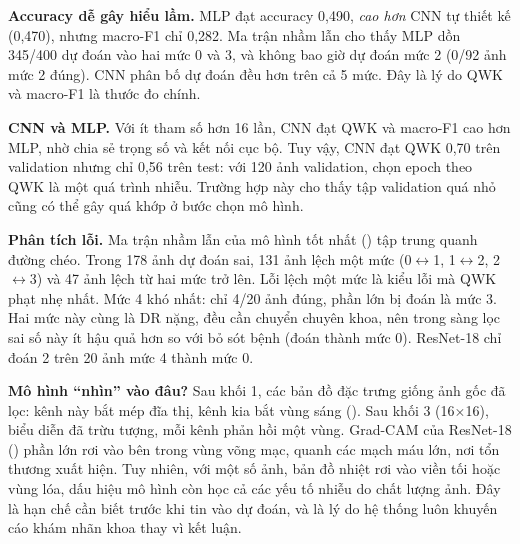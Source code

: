 \textbf{Accuracy dễ gây hiểu lầm.} MLP đạt accuracy 0,490, \emph{cao hơn} CNN tự thiết kế (0,470), nhưng macro-F1 chỉ 0,282. Ma trận nhầm lẫn cho thấy MLP dồn 345/400 dự đoán vào hai mức 0 và 3, và không bao giờ dự đoán mức 2 (0/92 ảnh mức 2 đúng). CNN phân bố dự đoán đều hơn trên cả 5 mức. Đây là lý do QWK và macro-F1 là thước đo chính.

\textbf{CNN và MLP.} Với ít tham số hơn 16 lần, CNN đạt QWK và macro-F1 cao hơn MLP, nhờ chia sẻ trọng số và kết nối cục bộ. Tuy vậy, CNN đạt QWK 0,70 trên validation nhưng chỉ 0,56 trên test: với 120 ảnh validation, chọn epoch theo QWK là một quá trình nhiễu. Trường hợp này cho thấy tập validation quá nhỏ cũng có thể gây quá khớp ở bước chọn mô hình.


\textbf{Phân tích lỗi.} Ma trận nhầm lẫn của mô hình tốt nhất () tập trung quanh đường chéo. Trong 178 ảnh dự đoán sai, 131 ảnh lệch một mức (0$\leftrightarrow$1, 1$\leftrightarrow$2, 2$\leftrightarrow$3) và 47 ảnh lệch từ hai mức trở lên. Lỗi lệch một mức là kiểu lỗi mà QWK phạt nhẹ nhất. Mức 4 khó nhất: chỉ 4/20 ảnh đúng, phần lớn bị đoán là mức 3. Hai mức này cùng là DR nặng, đều cần chuyển chuyên khoa, nên trong sàng lọc sai số này ít hậu quả hơn so với bỏ sót bệnh (đoán thành mức 0). ResNet-18 chỉ đoán 2 trên 20 ảnh mức 4 thành mức 0.



\textbf{Mô hình ``nhìn'' vào đâu?} Sau khối 1, các bản đồ đặc trưng giống ảnh gốc đã lọc: kênh này bắt mép đĩa thị, kênh kia bắt vùng sáng (). Sau khối 3 (16×16), biểu diễn đã trừu tượng, mỗi kênh phản hồi một vùng. Grad-CAM của ResNet-18 () phần lớn rơi vào bên trong vùng võng mạc, quanh các mạch máu lớn, nơi tổn thương xuất hiện. Tuy nhiên, với một số ảnh, bản đồ nhiệt rơi vào viền tối hoặc vùng lóa, dấu hiệu mô hình còn học cả các yếu tố nhiễu do chất lượng ảnh. Đây là hạn chế cần biết trước khi tin vào dự đoán, và là lý do hệ thống luôn khuyến cáo khám nhãn khoa thay vì kết luận.



